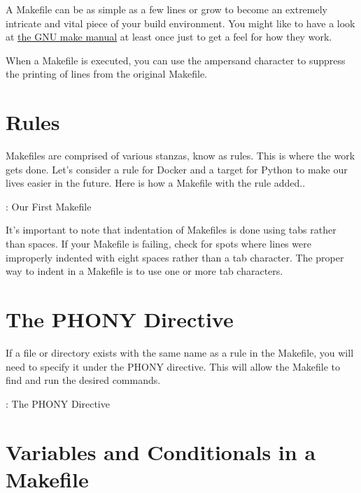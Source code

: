 \justifying
A Makefile can be as simple as a few lines or grow to become an extremely intricate and vital piece of your
build environment. You might like to have a look at
\href{https://www.gnu.org/software/make/manual/make.html#Introduction}{the GNU make manual} at least once just to get a feel for how they work.

\justifying
When a Makefile is executed, you can use the ampersand character to suppress the printing of lines from the original Makefile.

\section{Rules}

\justifying
Makefiles are comprised of various stanzas, know as rules. This is where the work gets done. Let's consider a rule
for Docker and a target for Python to make our lives easier in the future. Here is how a Makefile with the rule added..

\justifying
\begin{mybox}{\thetcbcounter: Our First Makefile}
	
\end{mybox}

\justifying
It's important to note that indentation of Makefiles is done using tabs rather than spaces. If your Makefile is failing, check for spots where lines were improperly
indented with eight spaces rather than a tab character. The proper way to indent in a Makefile is to use one or more tab characters.

\section{The PHONY Directive}

\justifying
If a file or directory exists with the same name as a rule in the Makefile, you will need to specify
it under the PHONY directive. This will allow the Makefile to find and run the desired commands.

\justifying
\begin{mybox}{\thetcbcounter: The PHONY Directive}
	
\end{mybox}


\section{Variables and Conditionals in a Makefile}

